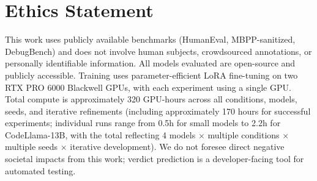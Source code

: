 \documentclass[11pt,a4paper]{article}
\begin{document}
\section*{Ethics Statement}

This work uses publicly available benchmarks (HumanEval, MBPP-sanitized, DebugBench) and does not involve human subjects, crowdsourced annotations, or personally identifiable information.
All models evaluated are open-source and publicly accessible.
Training uses parameter-efficient LoRA fine-tuning on two RTX PRO 6000 Blackwell GPUs, with each experiment using a single GPU.
Total compute is approximately 320 GPU-hours across all conditions, models, seeds, and iterative refinements (including approximately 170 hours for successful experiments; individual runs range from 0.5h for small models to 2.2h for CodeLlama-13B, with the total reflecting 4 models $\times$ multiple conditions $\times$ multiple seeds $\times$ iterative development).
We do not foresee direct negative societal impacts from this work; verdict prediction is a developer-facing tool for automated testing.



\appendix

\end{document}
